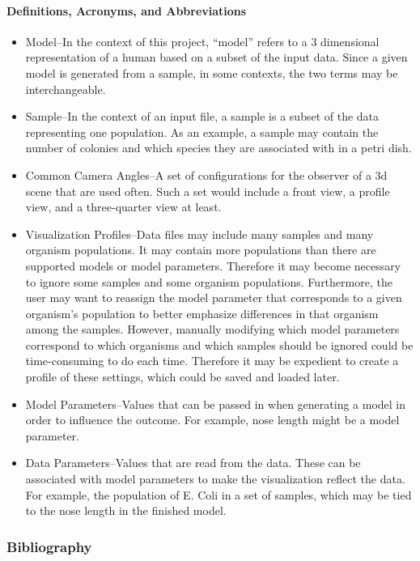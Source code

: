 \documentclass[letterpaper,10pt, onecolumn, draftclsnofoot]{IEEEtran}
\begin{document}
\paragraph{Definitions, Acronyms, and Abbreviations}
\begin{itemize}
	\item Model--In the context of this project, ``model'' refers to a 3 dimensional representation of a human based on a subset of the input data. Since a given model is generated from a sample, in some contexts, the two terms may be interchangeable. 
	\item Sample--In the context of an input file, a sample is a subset of the data representing one population. As an example, a sample may contain the number of colonies and which species they are associated with in a petri dish.
	\item Common Camera Angles--A set of configurations for the observer of a 3d scene that are used often. Such a set would include a front view, a profile view, and a three-quarter view at least.
	\item Visualization Profiles--Data files may include many samples and many organism populations. It may contain more populations than there are supported models or model parameters. Therefore it may become necessary to ignore some samples and some organism populations. Furthermore, the user may want to reassign the model parameter that corresponds to a given organism's population to better emphasize differences in that organism among the samples. However, manually modifying which model parameters correspond to which organisms and which samples should be ignored could be time-consuming to do each time. Therefore it may be expedient to create a profile of these settings, which could be saved and loaded later.
	\item Model Parameters--Values that can be passed in when generating a model in order to influence the outcome. For example, nose length might be a model parameter.
	\item Data Parameters--Values that are read from the data. These can be associated with model parameters to make the visualization reflect the data. For example, the population of E. Coli in a set of samples, which may be tied to the nose length in the finished model.
\end{itemize}

\subsubsection{Bibliography}
\end{document}
